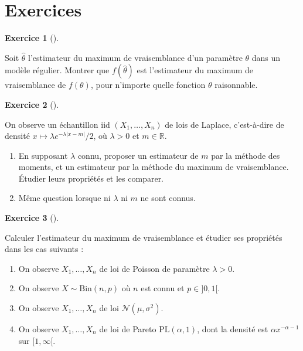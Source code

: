 \documentclass[
  10,
  letterpaper,
  DIV=11,
  numbers=noendperiod]{scrreport}
\providecommand{\tightlist}{%
  \setlength{\itemsep}{0pt}\setlength{\parskip}{0pt}}\usepackage{longtable,booktabs,array}
\theoremstyle{plain}
\theoremstyle{definition}
\newtheorem{exercise}{Exercice}[chapter]
\theoremstyle{plain}
\theoremstyle{definition}
\theoremstyle{definition}
\theoremstyle{plain}
\theoremstyle{remark}
\begin{document}
\hypertarget{exercices-9}{%
\section*{Exercices}\label{exercices-9}}


\begin{exercise}[]\protect\hypertarget{exr-mlef}{}\label{exr-mlef}

Soit \(\hat{\theta}\) l'estimateur du maximum de vraisemblance d'un
paramètre \(\theta\) dans un modèle régulier. Montrer que
\(f(\hat{\theta})\) est l'estimateur du maximum de vraisemblance de
\(f(\theta)\), pour n'importe quelle fonction \(\theta\) raisonnable.

\end{exercise}

\begin{exercise}[]\protect\hypertarget{exr-laplace}{}\label{exr-laplace}

On observe un échantillon iid \((X_1, \dotsc, X_n)\) de lois de Laplace,
c'est-à-dire de densité \(x\mapsto \lambda e^{-\lambda|x-m|} / 2\), où
\(\lambda>0\) et \(m\in \mathbb{R}\).

\begin{enumerate}
\def\labelenumi{\arabic{enumi}.}
\tightlist
\item
  En supposant \(\lambda\) connu, proposer un estimateur de \(m\) par la
  méthode des moments, et un estimateur par la méthode du maximum de
  vraisemblance. Étudier leurs propriétés et les comparer.
\item
  Même question lorsque ni \(\lambda\) ni \(m\) ne sont connus.
\end{enumerate}

\end{exercise}

\begin{exercise}[]\protect\hypertarget{exr-exemv}{}\label{exr-exemv}

Calculer l'estimateur du maximum de vraisemblance et étudier ses
propriétés dans les cas suivants :~

\begin{enumerate}
\def\labelenumi{\arabic{enumi}.}
\tightlist
\item
  On observe \(X_1, \dotsc, X_n\) de loi de Poisson de paramètre
  \(\lambda>0\).
\item
  On observe \(X \sim \mathrm{Bin}(n,p)\) où \(n\) est connu et
  \(p\in ]0,1[\).
\item
  On observe \(X_1, \dotsc, X_n\) de loi \(\mathscr{N}(\mu,\sigma^2)\).
\item
  On observe \(X_1, \dotsc, X_n\) de loi de Pareto
  \(\mathrm{PL}(\alpha,1)\), dont la densité est
  \(\alpha x^{-\alpha-1}\) sur \([1,\infty[\).
\end{enumerate}

\end{exercise}
\end{document}
